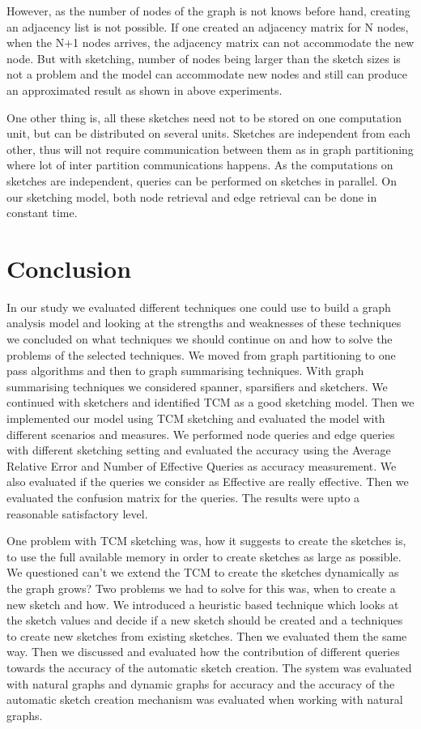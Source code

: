 \documentclass[conference]{IEEEtran}
\begin{document}
However, as the number of nodes of the graph is not knows before hand, creating an adjacency list is not possible. If one created an adjacency matrix for N nodes, when the N+1 nodes arrives, the adjacency matrix can not accommodate the new node. But with sketching, number of nodes being larger than the sketch sizes is not a problem and the model can accommodate new nodes and still can produce an approximated result as shown in above experiments. 


One other thing is, all these sketches need not to be stored on one computation unit, but can be distributed on several units. Sketches are independent from each other, thus will not require communication between them as in graph partitioning where lot of inter partition communications happens. As the computations on sketches are independent, queries can be performed on sketches in parallel. On our sketching model, both node retrieval and edge retrieval can be done in constant time.  

\section{Conclusion}
In our study we evaluated different techniques one could use to build a graph analysis model and looking at the strengths and weaknesses of these techniques we concluded on what techniques we should continue on and  how to solve the problems of the selected techniques. We moved from graph partitioning to one pass algorithms and then to graph summarising techniques. With graph summarising techniques we considered spanner, sparsifiers and sketchers. We continued with sketchers and identified TCM as a good sketching model. Then we implemented our model using TCM sketching and evaluated  the model with different scenarios and measures. We performed node queries and edge queries with different sketching setting and evaluated the accuracy using the Average Relative Error and Number of Effective Queries as accuracy  measurement. We also evaluated if the queries we consider as Effective are really effective. Then we evaluated the confusion matrix for the queries. The results were upto a reasonable satisfactory level. 


One problem with TCM sketching was, how it suggests to create the sketches is, to use the full available  memory in order to create sketches as large as possible. We questioned can't we extend the TCM to create the sketches dynamically as the graph grows? Two problems we had to solve for this was, when to create a new sketch and how. We introduced a heuristic based technique which looks at the sketch values and decide if a new sketch should be created and a techniques to create new sketches from existing sketches. Then we evaluated them the same way. Then we discussed and evaluated how the contribution of different queries towards the accuracy of the automatic sketch creation. The system was evaluated with natural graphs and dynamic graphs for accuracy and the accuracy of the automatic sketch creation mechanism was evaluated when working with natural graphs.
\end{document}
